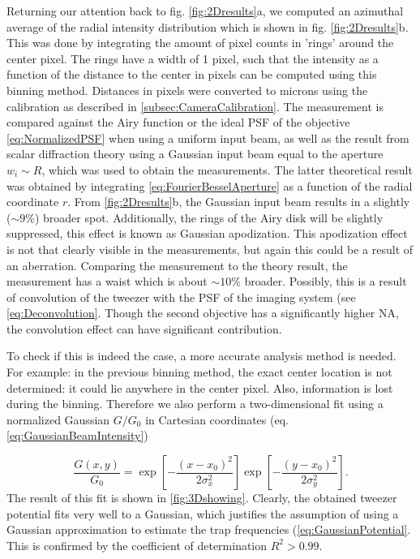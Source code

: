 Returning our attention back to fig. \ref{fig:2Dresults}a, we computed an azimuthal average of the radial intensity distribution which is shown in fig. \ref{fig:2Dresults}b.
This was done by integrating the amount of pixel counts in 'rings' around the center pixel.
The rings have a width of 1 pixel, such that the intensity as a function of the distance to the center in pixels can be computed using this binning method.
Distances in pixels were converted to microns using the calibration as described in \cref{subsec:CameraCalibration}.
The measurement is compared against the Airy function or the ideal \ac{PSF} of the objective \cref{eq:NormalizedPSF} when using a uniform input beam, as well as the result from scalar diffraction theory using a Gaussian input beam equal to the aperture $w_i \sim R$, which was used to obtain the measurements.
The latter theoretical result was obtained by integrating \cref{eq:FourierBesselAperture} as a function of the radial coordinate $r$.
From \ref{fig:2Dresults}b, the Gaussian input beam results in a slightly ($\sim 9\%$) broader spot.
Additionally, the rings of the Airy disk will be slightly suppressed, this effect is known as Gaussian apodization.
This apodization effect is not that clearly visible in the measurements, but again this could be a result of an aberration.
Comparing the measurement to the theory result, the measurement has a waist which is about $\sim 10\%$ broader. Possibly, this is a result of convolution of the tweezer with the \ac{PSF} of the imaging system (see \cref{eq:Deconvolution}. Though the second objective has a significantly higher NA, the convolution effect can have significant contribution.

To check if this is indeed the case, a more accurate analysis method is needed.
For example: in the previous binning method, the exact center location is not determined: it could lie anywhere in the center pixel. 
Also, information is lost during the binning. 
Therefore we also perform a two-dimensional fit using a normalized Gaussian $G/G_0$ in Cartesian coordinates (eq. \ref{eq:GaussianBeamIntensity})

\begin{equation}\label{eq:2DGaussian}
    \frac{G(x,y)}{G_0} =  
    \exp{\left[ -\frac{(x-x_0)^2}{2\sigma_x^2}\right]}
    \exp{\left[ -\frac{(y-x_0)^2}{2\sigma_y^2}\right]}.
\end{equation}
The result of this fit is shown in \cref{fig:3Dshowing}. 
Clearly, the obtained tweezer potential fits very well to a Gaussian, which justifies the assumption of using a Gaussian approximation to estimate the trap frequencies (\cref{eq:GaussianPotential}. 
This is confirmed by the coefficient of determination $R^2 > 0.99$.

